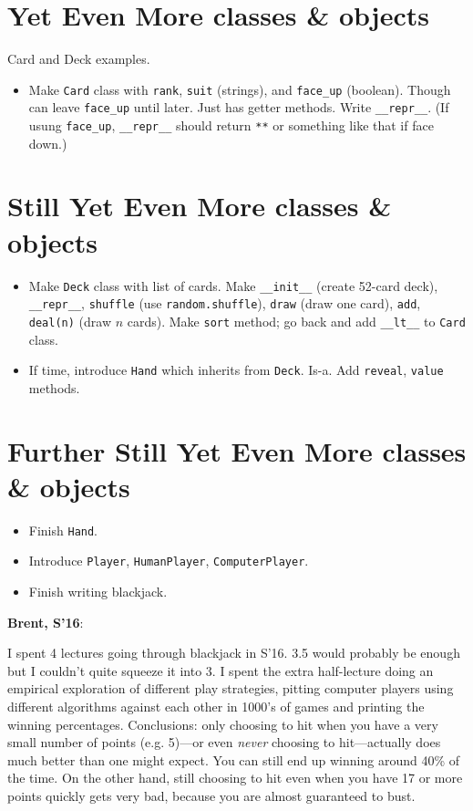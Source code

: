\documentclass{article}
\newenvironment{reflect}[1]
{
  \noindent
  \begin{lrbox}{\reflectbox}
    \begin{minipage}[t]{\textwidth}
      \textbf{#1}:
}{
    \end{minipage}
  \end{lrbox}
  \fbox{\usebox{\reflectbox}}
}
\begin{document}
\section{Yet Even More classes \& objects}

Card and Deck examples.
\begin{itemize}
\item Make \verb|Card| class with \verb|rank|, \verb|suit| (strings),
  and \verb|face_up| (boolean).  Though can leave \verb|face_up| until
  later.  Just has getter methods.  Write \verb|__repr__|. (If usung
  \verb|face_up|, \verb|__repr__| should return \verb|**| or something
  like that if face down.)
\end{itemize}

\section{Still Yet Even More classes \& objects}

\begin{itemize}
\item Make \verb|Deck| class with list of cards.  Make \verb|__init__|
  (create 52-card deck), \verb|__repr__|, \verb|shuffle| (use
  \verb|random.shuffle|), \verb|draw| (draw one card), \verb|add|,
  \verb|deal(n)| (draw $n$ cards).  Make \verb|sort| method; go back
  and add \verb|__lt__| to \verb|Card| class.
\item If time, introduce \verb|Hand| which inherits from \verb|Deck|.
  Is-a.  Add \verb|reveal|, \verb|value| methods.
\end{itemize}

\section{Further Still Yet Even More classes \& objects}

\begin{itemize}
\item Finish \verb|Hand|.
\item Introduce \verb|Player|, \verb|HumanPlayer|,
  \verb|ComputerPlayer|.
\item Finish writing blackjack.
\end{itemize}

\begin{reflect}{Brent, S'16}
  I spent 4 lectures going through blackjack in S'16.  3.5 would
  probably be enough but I couldn't quite squeeze it into 3.  I spent
  the extra half-lecture doing an empirical exploration of different
  play strategies, pitting computer players using different algorithms
  against each other in 1000's of games and printing the winning
  percentages.  Conclusions: only choosing to hit when you have a very
  small number of points (e.g. 5)---or even \emph{never} choosing to
  hit---actually does much better than one might expect.  You can
  still end up winning around 40\% of the time.  On the other hand,
  still choosing to hit even when you have 17 or more points quickly
  gets very bad, because you are almost guaranteed to bust.
\end{reflect}
\end{document}
